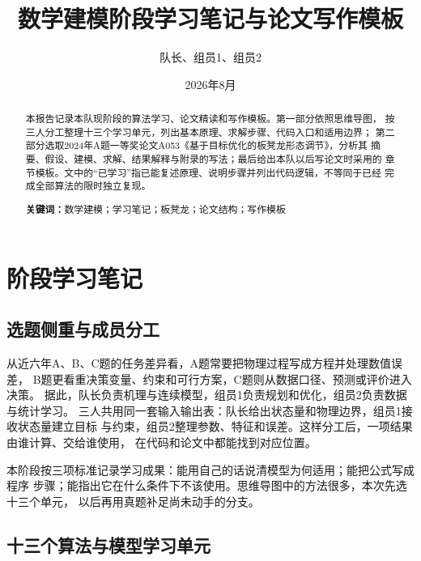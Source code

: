 \documentclass[UTF8,zihao=-4]{ctexart}
\title{\bfseries 数学建模阶段学习笔记与论文写作模板}
\author{队长、组员1、组员2}
\date{2026年8月}
\newcommand{\keywords}[1]{\par\noindent\textbf{关键词：}#1}
\begin{document}
\maketitle

\begin{abstract}
本报告记录本队现阶段的算法学习、论文精读和写作模板。第一部分依照思维导图，
按三人分工整理十三个学习单元，列出基本原理、求解步骤、代码入口和适用边界；
第二部分选取2024年A题一等奖论文A053《基于目标优化的板凳龙形态调节》，分析其
摘要、假设、建模、求解、结果解释与附录的写法；最后给出本队以后写论文时采用的
章节模板。文中的“已学习”指已能复述原理、说明步骤并列出代码逻辑，不等同于已经
完成全部算法的限时独立复现。

\keywords{数学建模；学习笔记；板凳龙；论文结构；写作模板}
\end{abstract}

\tableofcontents
\newpage

\section{阶段学习笔记}

\subsection{选题侧重与成员分工}

从近六年A、B、C题的任务差异看，A题常要把物理过程写成方程并处理数值误差，
B题更看重决策变量、约束和可行方案，C题则从数据口径、预测或评价进入决策。
据此，队长负责机理与连续模型，组员1负责规划和优化，组员2负责数据与统计学习。
三人共用同一套输入输出表：队长给出状态量和物理边界，组员1接收状态量建立目标
与约束，组员2整理参数、特征和误差。这样分工后，一项结果由谁计算、交给谁使用，
在代码和论文中都能找到对应位置。

本阶段按三项标准记录学习成果：能用自己的话说清模型为何适用；能把公式写成程序
步骤；能指出它在什么条件下不该使用。思维导图中的方法很多，本次先选十三个单元，
以后再用真题补足尚未动手的分支。

\subsection{十三个算法与模型学习单元}
\end{document}
